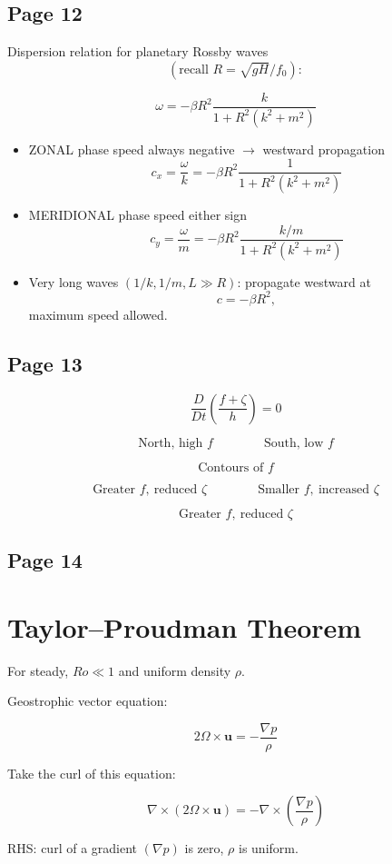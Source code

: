 \documentclass[11pt]{article}
\begin{document}
\subsection*{Page 12}
Dispersion relation for planetary Rossby waves
\[
\left(
\text{recall } R=\sqrt{gH}/f_0
\right):
\]

\[
\omega
=
-\beta R^2
\frac{k}{1+R^2(k^2+m^2)}
\]

\begin{itemize}
\item ZONAL phase speed always negative $\to$ westward propagation
\[
c_x=\frac{\omega}{k}
=
-\beta R^2
\frac{1}{1+R^2(k^2+m^2)}
\]
\item MERIDIONAL phase speed either sign
\[
c_y=\frac{\omega}{m}
=
-\beta R^2
\frac{k/m}{1+R^2(k^2+m^2)}
\]
\item Very long waves $(1/k,1/m,L \gg R)$: propagate westward at
\[
c=-\beta R^2,
\]
maximum speed allowed.
\end{itemize}

\subsection*{Page 13}
\[
\frac{D}{Dt}\left(\frac{f+\zeta}{h}\right)=0
\]

\[
\text{North, high }f
\qquad\qquad
\text{South, low }f
\]

\[
\text{Contours of }f
\]

\[
\text{Greater }f,\ \text{reduced }\zeta
\qquad\qquad
\text{Smaller }f,\ \text{increased }\zeta
\]

\[
\text{Greater }f,\ \text{reduced }\zeta
\]

\subsection*{Page 14}
\section*{Taylor--Proudman Theorem}

For steady, $Ro \ll 1$ and uniform density $\rho$.

Geostrophic vector equation:

\[
2\Omega \times \mathbf{u}
=
-\frac{\nabla p}{\rho}
\]

Take the curl of this equation:

\[
\nabla \times (2\Omega \times \mathbf{u})
=
-\nabla \times \left(\frac{\nabla p}{\rho}\right)
\]

RHS: curl of a gradient $(\nabla p)$ is zero, $\rho$ is uniform.
\end{document}
